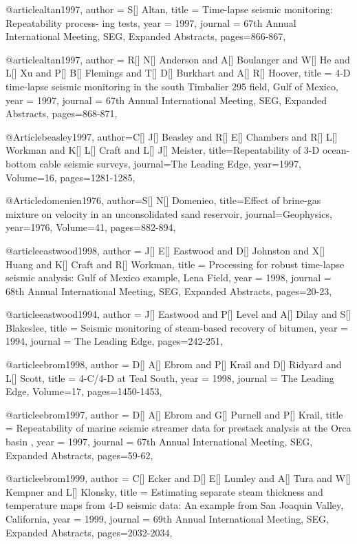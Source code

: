@article{altan1997,
  author =	 {S[] Altan},
  title =	 {Time-lapse seismic monitoring: Repeatability process-
ing tests},
  year =	 1997,
  journal =	 {67th Annual International Meeting, SEG, Expanded Abstracts},
 pages=866-867,
}

@article{altan1997,
  author =	 {R[] N[] Anderson and A[] Boulanger and W[] He and L[] Xu and P[] B[] Flemings and T[] D[] Burkhart and A[] R[] Hoover},
  title =	 {4-D time-lapse seismic
monitoring in the south Timbalier 295 field, Gulf of Mexico},
  year =	 1997,
  journal =	 {67th Annual International Meeting, SEG, Expanded Abstracts},
 pages=868-871,
}

@Article{beasley1997,
  author={C[] J[] Beasley and R[] E[] Chambers and R[] L[] Workman and K[] L[] Craft and L[] J[] Meister},
  title={Repeatability of 3-D ocean-bottom cable seismic
surveys},
  journal={The Leading Edge},
  year=1997,
  Volume=16,
  pages={1281-1285},
}


@Article{domenien1976,
  author={S[] N[] Domenieo},
  title={Effect of brine-gas mixture on velocity in an
unconsolidated sand reservoir},
  journal={Geophysics},
  year=1976,
  Volume=41,
  pages={882-894},
}

@article{eastwood1998,
  author =	 {J[] E[] Eastwood and D[] Johnston and X[] Huang and K[] Craft and R[] Workman},
  title =	 { Processing for robust time-lapse seismic analysis: Gulf of
Mexico example, Lena Field},
  year =	 1998,
  journal =	 {68th Annual International Meeting, SEG, Expanded Abstracts},
 pages=20-23,
}


@article{eastwood1994,
  author =	 {J[] Eastwood and P[] Level and A[] Dilay and S[] Blakeslee},
  title =	 {Seismic monitoring of steam-based recovery of bitumen},
  year =	 1994,
  journal =	 {The Leading Edge},
 pages=242-251,
}

@article{ebrom1998,
  author =	 {D[] A[] Ebrom and P[] Krail and D[] Ridyard and L[] Scott},
  title =	 {4-C/4-D at Teal South},
  year =	 1998,
  journal =	 {The Leading Edge},
    Volume=17,
 pages=1450-1453,
}

@article{ebrom1997,
  author =	 {D[] A[] Ebrom and G[] Purnell and P[] Krail},
  title =	 { Repeatability of marine seismic streamer data for prestack analysis at the Orca basin },
  year =	 1997,
  journal =	 {67th Annual International Meeting, SEG, Expanded Abstracts},
 pages=59-62,
}

@article{ebrom1999,
  author =	 {C[] Ecker and D[] E[] Lumley and A[] Tura and W[] Kempner and L[] Klonsky},
  title =	 {Estimating separate steam thickness and temperature maps from 4-D seismic data: An example from San Joaquin Valley, California},
  year =	 1999,
  journal =	 {69th Annual International Meeting, SEG, Expanded Abstracts},
 pages=2032-2034,
}

